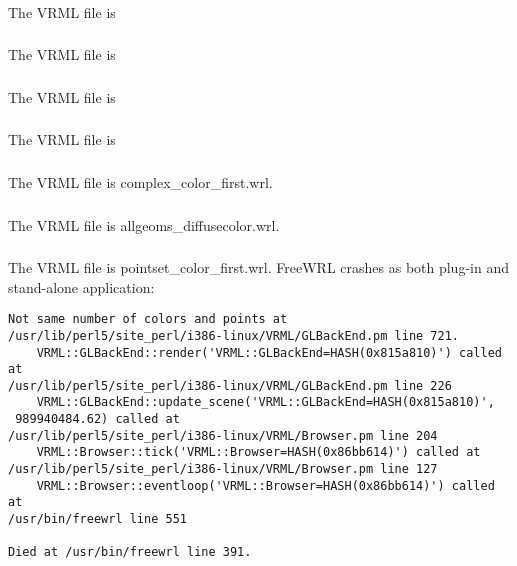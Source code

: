 \documentclass[12pt,letterpaper]{article}
\begin{document}
\subsubsection{}
The VRML file is

\subsubsection{}
The VRML file is

\subsubsection{}
The VRML file is

\subsubsection{}
The VRML file is

\subsubsection{}
The VRML file is complex\_color\_first.wrl.

\subsubsection{}
The VRML file is allgeoms\_diffusecolor.wrl.

\subsubsection{} 
The VRML file is pointset\_color\_first.wrl.\newline
FreeWRL crashes as both plug-in and stand-alone application:
\begin{verbatim}
Not same number of colors and points at 
/usr/lib/perl5/site_perl/i386-linux/VRML/GLBackEnd.pm line 721.
    VRML::GLBackEnd::render('VRML::GLBackEnd=HASH(0x815a810)') called at 
/usr/lib/perl5/site_perl/i386-linux/VRML/GLBackEnd.pm line 226
    VRML::GLBackEnd::update_scene('VRML::GLBackEnd=HASH(0x815a810)',
 989940484.62) called at
/usr/lib/perl5/site_perl/i386-linux/VRML/Browser.pm line 204
    VRML::Browser::tick('VRML::Browser=HASH(0x86bb614)') called at 
/usr/lib/perl5/site_perl/i386-linux/VRML/Browser.pm line 127
    VRML::Browser::eventloop('VRML::Browser=HASH(0x86bb614)') called at 
/usr/bin/freewrl line 551

Died at /usr/bin/freewrl line 391.
\end{verbatim}
\end{document}
